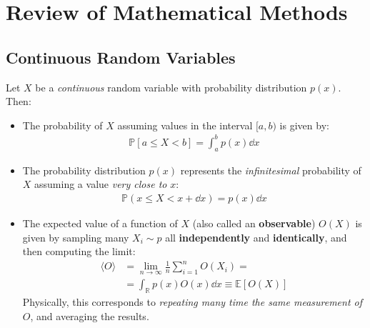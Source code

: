 \documentclass[../../main.tex]{subfiles}
\begin{document}
\section{Review of Mathematical Methods}
\subsection{Continuous Random Variables}
Let $X$ be a \textit{continuous} random variable with probability distribution $p(x)$. Then:
\begin{itemize}
    \item The probability of $X$ assuming values in the interval $[a,b)$ is given by:
    \begin{align*}
        \mathbb{P}[a \leq X < b] = \int_a^b p(x) \dd{x}
    \end{align*}
    \item The probability distribution $p(x)$ represents the \textit{infinitesimal} probability of $X$ assuming a value \textit{very close to} $x$:
    \begin{align*}
        \mathbb{P}(x \leq X < x+ \dd{x}) = p(x) \dd{x}
    \end{align*} 
    \item The expected value of a function of $X$ (also called an \textbf{observable}) $O(X)$ is given by sampling many $X_i \sim p$ all \textbf{independently} and \textbf{identically}, and then computing the limit:
    \begin{align*}
        \langle O \rangle &= \lim_{n \to \infty} \frac{1}{n} \sum_{i=1}^n O(X_i) =\\
        &= \int_{\mathbb{R}} p(x) O(x) \dd{x} \equiv \mathbb{E}[O(X)]
    \end{align*}  
    Physically, this corresponds to \textit{repeating many time the same measurement of $O$}, and averaging the results.
\end{itemize}
\end{document}
